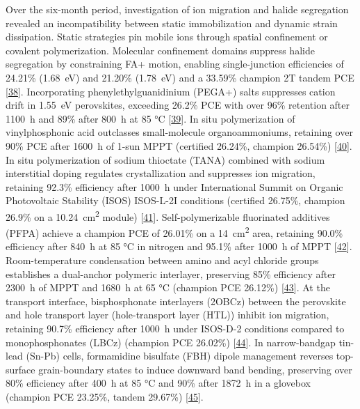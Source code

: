 \documentclass[
  11pt,
]{article}
\begin{document}
Over the six-month period, investigation of ion migration and halide
segregation revealed an incompatibility between static immobilization
and dynamic strain dissipation. Static strategies pin mobile ions
through spatial confinement or covalent polymerization. Molecular
confinement domains suppress halide segregation by constraining FA+
motion, enabling single-junction efficiencies of 24.21\%
(\qty{1.68}{\electronvolt}) and 21.20\% (\qty{1.78}{\electronvolt}) and
a 33.59\% champion 2T tandem PCE
{[}\href{https://doi.org/10.1002/adma.73713}{38}{]}. Incorporating
phenylethylguanidinium (PEGA+) salts suppresses cation drift in
\qty{1.55}{\electronvolt} perovskites, exceeding 26.2\% PCE with over
96\% retention after \qty{1100}{\hour} and 89\% after \qty{800}{\hour}
at 85 °C {[}\href{https://doi.org/10.1021/acsenergylett.6c00737}{39}{]}.
In situ polymerization of vinylphosphonic acid outclasses small-molecule
organoammoniums, retaining over 90\% PCE after \qty{1600}{\hour} of
1-sun MPPT (certified 26.24\%, champion 26.54\%)
{[}\href{https://doi.org/10.1002/adma.202522825}{40}{]}. In situ
polymerization of sodium thioctate (TANA) combined with sodium
interstitial doping regulates crystallization and suppresses ion
migration, retaining 92.3\% efficiency after \qty{1000}{\hour} under
International Summit on Organic Photovoltaic Stability (ISOS) ISOS-L-2I
conditions (certified 26.75\%, champion 26.9\% on a
\qty{10.24}{\centi\meter\squared} module)
{[}\href{https://doi.org/10.1002/anie.202525815}{41}{]}.
Self-polymerizable fluorinated additives (PFPA) achieve a champion PCE
of 26.01\% on a \qty{14}{\centi\meter\squared} area, retaining 90.0\%
efficiency after \qty{840}{\hour} at 85 °C in nitrogen and 95.1\% after
\qty{1000}{\hour} of MPPT
{[}\href{https://doi.org/10.1021/acsenergylett.5c03901}{42}{]}.
Room-temperature condensation between amino and acyl chloride groups
establishes a dual-anchor polymeric interlayer, preserving 85\%
efficiency after \qty{2300}{\hour} of MPPT and \qty{1680}{\hour} at 65
°C (champion PCE 26.12\%)
{[}\href{https://doi.org/10.1002/anie.7579788}{43}{]}. At the transport
interface, bisphosphonate interlayers (2OBCz) between the perovskite and
hole transport layer (hole-transport layer (HTL)) inhibit ion migration,
retaining 90.7\% efficiency after \qty{1000}{\hour} under ISOS-D-2
conditions compared to monophosphonates (LBCz) (champion PCE 26.02\%)
{[}\href{https://doi.org/10.1002/adfm.75412}{44}{]}. In narrow-bandgap
tin-lead (Sn-Pb) cells, formamidine bisulfate (FBH) dipole management
reverses top-surface grain-boundary states to induce downward band
bending, preserving over 80\% efficiency after \qty{400}{\hour} at 85 °C
and 90\% after \qty{1872}{\hour} in a glovebox (champion PCE 23.25\%,
tandem 29.67\%) {[}\href{https://doi.org/10.1002/adma.72755}{45}{]}.
\end{document}
